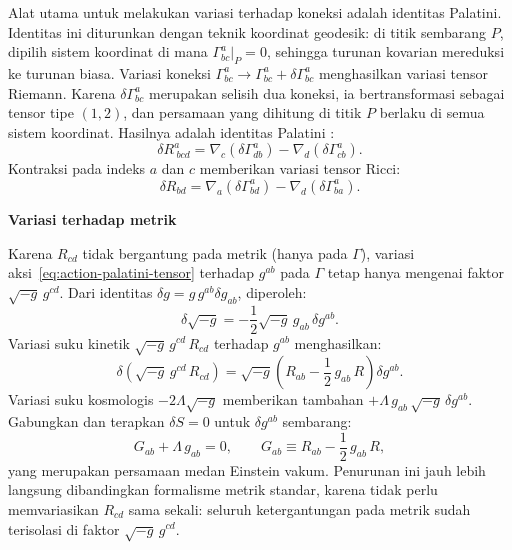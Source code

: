 Alat utama untuk melakukan variasi terhadap koneksi adalah identitas Palatini. Identitas ini diturunkan dengan teknik koordinat geodesik: di titik sembarang $P$, dipilih sistem koordinat di mana $\Gamma^a_{bc}|_P = 0$, sehingga turunan kovarian mereduksi ke turunan biasa. Variasi koneksi $\Gamma^a_{bc} \to \Gamma^a_{bc} + \delta\Gamma^a_{bc}$ menghasilkan variasi tensor Riemann. Karena $\delta\Gamma^a_{bc}$ merupakan selisih dua koneksi, ia bertransformasi sebagai tensor tipe $(1,2)$, dan persamaan yang dihitung di titik $P$ berlaku di semua sistem koordinat. Hasilnya adalah identitas Palatini \cite{dinverno1992introducing}:
\begin{equation}\label{eq:palatini-identity}
    \delta R^a_{\ bcd} = \nabla_c(\delta\Gamma^a_{db}) - \nabla_d(\delta\Gamma^a_{cb}).
\end{equation}
Kontraksi pada indeks $a$ dan $c$ memberikan variasi tensor Ricci:
\begin{equation}\label{eq:var-ricci}
    \delta R_{bd} = \nabla_a(\delta\Gamma^a_{bd}) - \nabla_d(\delta\Gamma^a_{ba}).
\end{equation}


\vspace{0.5em}
\noindent \textbf{Variasi terhadap metrik}

Karena $R_{cd}$ tidak bergantung pada metrik (hanya pada $\Gamma$), variasi aksi~\eqref{eq:action-palatini-tensor} terhadap $g^{ab}$ pada $\Gamma$ tetap hanya mengenai faktor $\sqrt{-g}\, g^{cd}$. Dari identitas $\delta g = g\, g^{ab}\delta g_{ab}$, diperoleh:
\begin{equation}\label{eq:var-sqrt-g}
    \delta\sqrt{-g} = -\frac{1}{2}\sqrt{-g}\, g_{ab}\,\delta g^{ab}.
\end{equation}
Variasi suku kinetik $\sqrt{-g}\, g^{cd}\, R_{cd}$ terhadap $g^{ab}$ menghasilkan:
\begin{equation}
    \delta\!\left(\sqrt{-g}\, g^{cd}\, R_{cd}\right) = \sqrt{-g}\left(R_{ab} - \frac{1}{2}\, g_{ab}\, R\right)\delta g^{ab}.
\end{equation}
Variasi suku kosmologis $-2\Lambda\sqrt{-g}$ memberikan tambahan $+\Lambda\, g_{ab}\,\sqrt{-g}\,\delta g^{ab}$. Gabungkan dan terapkan $\delta S = 0$ untuk $\delta g^{ab}$ sembarang:
\begin{equation}\label{eq:einstein-eq-tensor}
    G_{ab} + \Lambda\, g_{ab} = 0, \qquad G_{ab} \equiv R_{ab} - \frac{1}{2}\, g_{ab}\, R,
\end{equation}
yang merupakan persamaan medan Einstein vakum. Penurunan ini jauh lebih langsung dibandingkan formalisme metrik standar, karena tidak perlu memvariasikan $R_{cd}$ sama sekali: seluruh ketergantungan pada metrik sudah terisolasi di faktor $\sqrt{-g}\, g^{cd}$.


